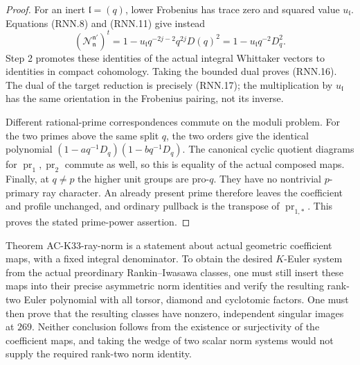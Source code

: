 \begin{proof}
For an inert \(\mathfrak l=(q)\), lower Frobenius has trace
zero and squared value \(u_{\mathfrak l}\).
Equations (RNN.8) and (RNN.11) give instead
\[
 (\mathcal N_{\mathfrak n}^{\mathfrak n'})^t
      =1-u_{\mathfrak l}q^{-2j-2}q^{2j}D(q)^2
      =1-u_{\mathfrak l}q^{-2}D_q^2 .
 \tag{RNN.19}
\]
Step 2 promotes these identities of the actual integral
Whittaker vectors to identities in compact cohomology.
Taking the bounded dual proves (RNN.16).
The dual of the target reduction is precisely (RNN.17);
the multiplication by \(u_{\mathfrak l}\) has the same
orientation in the Frobenius pairing, not its inverse.

Different rational-prime correspondences commute on the
moduli problem.  For the two primes above the same split
\(q\), the two orders give the identical polynomial
\((1-aq^{-1}D_q)(1-bq^{-1}D_q)\).
The canonical cyclic quotient diagrams for
\(\operatorname{pr}_1,\operatorname{pr}_2\) commute as
well, so this is equality of the actual composed maps.
Finally, at \(q\ne p\) the higher unit groups are pro-\(q\).
They have no nontrivial \(p\)-primary ray character.
An already present prime therefore leaves the coefficient
and profile unchanged, and ordinary pullback is the
transpose of \(\operatorname{pr}_{1,*}\).
This proves the stated prime-power assertion.
\end{proof}

\begin{remark}
Theorem AC-K33-ray-norm is a statement about actual geometric
coefficient maps, with a fixed integral denominator.
To obtain the desired \(K\)-Euler system from the actual
preordinary Rankin--Iwasawa classes, one must still insert
these maps into their precise asymmetric norm identities
and verify the resulting rank-two Euler polynomial with
all torsor, diamond and cyclotomic factors.
One must then prove that the resulting classes have
nonzero, independent singular images at \(269\).
Neither conclusion follows from the existence or
surjectivity of the coefficient maps, and taking the
wedge of two scalar norm systems would not supply the
required rank-two norm identity.
\end{remark}
